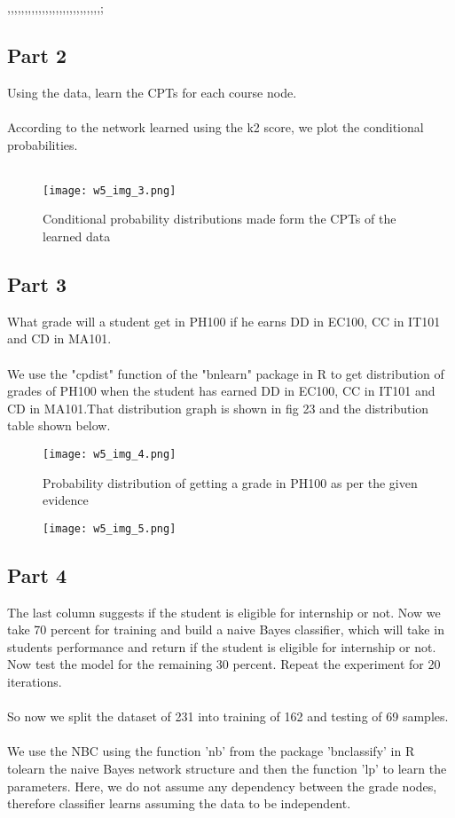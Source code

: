,,,,,,,,,,,,,,,,,,,,,,,,,,,;\documentclass[conference]{IEEEtran}
\begin{document}
\subsection{Part 2}
Using the data, learn the CPTs for each course node.
\\
\\
According to the network learned using the k2 score, we
plot the conditional probabilities.
\\
\\

\begin{figure}[htbp]
\centerline{\texttt{[image: w5\_img\_3.png]}}
\caption{Conditional probability distributions made form the
CPTs of the learned data}
\label{fig}
\end{figure}

\subsection{Part 3}
What grade will a student get in PH100 if he earns DD in
EC100, CC in IT101 and CD in MA101.
\\
\\
We use the "cpdist" function of the "bnlearn" package in R to get distribution of grades of PH100 when the student has earned DD in EC100, CC in IT101 and CD in MA101.That distribution graph is shown in fig 23 and the distribution table shown below.

\begin{figure}[htbp]
\centerline{\texttt{[image: w5\_img\_4.png]}}
\caption{Probability distribution of getting a grade in PH100
as per the given evidence}
\label{fig}
\end{figure}

\begin{figure}[htbp]
\centerline{\texttt{[image: w5\_img\_5.png]}}

\label{fig}
\end{figure}


\subsection{Part 4}
The last column suggests if the student is eligible for internship or not.
Now we take 70 percent for training and build a naive Bayes classifier, which will take in students performance and return if the student is eligible for internship or not. Now test the model for the remaining 30 percent. Repeat the experiment for 20 iterations.
\\
\\
So now we split the dataset of 231 into training of 162 and testing of 69 samples.
\\
\\
We use the NBC using the function 'nb' from the package 'bnclassify' in R tolearn the naive Bayes network structure and then the function ’lp’ to learn the parameters. Here, we do not assume any dependency between
the grade nodes, therefore classifier learns assuming the data to be independent.
\end{document}
